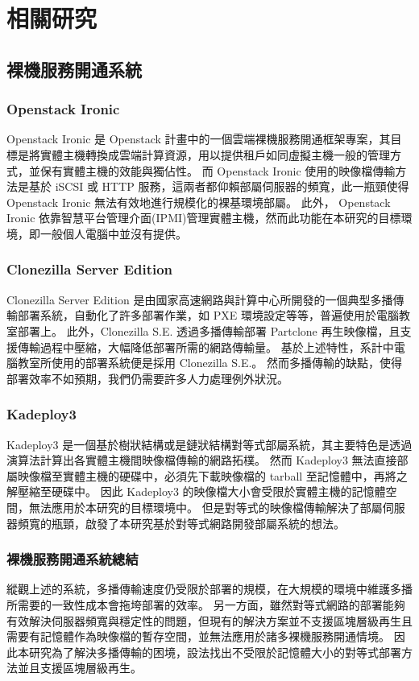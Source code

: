 \chapter{相關研究}
\section{裸機服務開通系統}
\subsection{Openstack Ironic}
Openstack Ironic 是 Openstack 計畫中的一個雲端裸機服務開通框架專案，其目標是將實體主機轉換成雲端計算資源，用以提供租戶如同虛擬主機一般的管理方式，並保有實體主機的效能與獨佔性。
而 Openstack Ironic 使用的映像檔傳輸方法是基於 iSCSI 或 HTTP 服務，這兩者都仰賴部屬伺服器的頻寬，此一瓶頸使得 Openstack Ironic 無法有效地進行規模化的裸基環境部屬。
此外， Openstack Ironic 依靠智慧平台管理介面(IPMI)管理實體主機，然而此功能在本研究的目標環境，即一般個人電腦中並沒有提供。

\subsection{Clonezilla Server Edition}
Clonezilla Server Edition 是由國家高速網路與計算中心所開發的一個典型多播傳輸部署系統，自動化了許多部署作業，如 PXE 環境設定等等，普遍使用於電腦教室部署上。
此外，Clonezilla S.E. 透過多播傳輸部署 Partclone 再生映像檔，且支援傳輸過程中壓縮，大幅降低部署所需的網路傳輸量。
基於上述特性，系計中電腦教室所使用的部署系統便是採用 Clonezilla S.E.。
然而多播傳輸的缺點，使得部署效率不如預期，我們仍需要許多人力處理例外狀況。

\subsection{Kadeploy3}
Kadeploy3 是一個基於樹狀結構或是鏈狀結構對等式部屬系統，其主要特色是透過演算法計算出各實體主機間映像檔傳輸的網路拓樸。
然而 Kadeploy3 無法直接部屬映像檔至實體主機的硬碟中，必須先下載映像檔的 tarball 至記憶體中，再將之解壓縮至硬碟中。
因此 Kadeploy3 的映像檔大小會受限於實體主機的記憶體空間，無法應用於本研究的目標環境中。
但是對等式的映像檔傳輸解決了部屬伺服器頻寬的瓶頸，啟發了本研究基於對等式網路開發部屬系統的想法。

\subsection{裸機服務開通系統總結}
縱觀上述的系統，多播傳輸速度仍受限於部署的規模，在大規模的環境中維護多播所需要的一致性成本會拖垮部署的效率。
另一方面，雖然對等式網路的部署能夠有效解決伺服器頻寬與穩定性的問題，但現有的解決方案並不支援區塊層級再生且需要有記憶體作為映像檔的暫存空間，並無法應用於諸多裸機服務開通情境。
因此本研究為了解決多播傳輸的困境，設法找出不受限於記憶體大小的對等式部署方法並且支援區塊層級再生。

